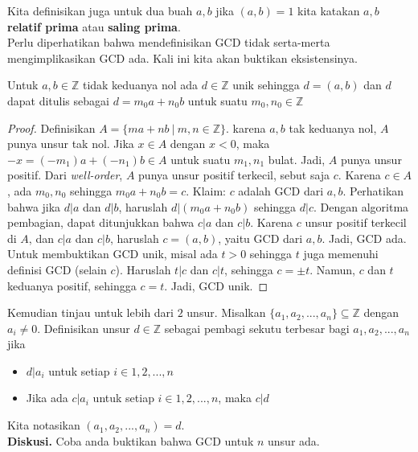 	Kita definisikan juga untuk dua buah $a,b$ jika $(a,b) = 1$ kita katakan $a,b$ \textbf{relatif prima} atau \textbf{saling prima}.
	\\
	
	Perlu diperhatikan bahwa mendefinisikan GCD tidak serta-merta mengimplikasikan GCD ada. Kali ini kita akan buktikan eksistensinya.
	
	\begin{theorem}
		Untuk $a,b \in \mathbb{Z}$ tidak keduanya nol ada $d \in \mathbb{Z}$ unik sehingga $d = (a,b)$ dan $d$ dapat ditulis sebagai $d = m_0a + n_0b$ untuk suatu $m_0,n_0 \in \mathbb{Z}$
	\end{theorem}
	
	\begin{proof}
		 Definisikan $A = \{ma + nb \ | \ m,n \in \mathbb{Z}\}$. karena $a,b$ tak keduanya nol, $A$ punya unsur tak nol. Jika $x \in A$ dengan $x < 0$, maka $-x = (-m_1)a + (-n_1)b \in A$ untuk suatu $m_1, n_1$ bulat. Jadi, $A$ punya unsur positif. Dari \textit{well-order}, $A$ punya unsur positif terkecil, sebut saja $c$. Karena $c \in A$, ada $m_0, n_0$ sehingga $m_0a + n_0b = c$. Klaim: $c$ adalah GCD dari $a,b$. Perhatikan bahwa jika $d | a$ dan $d |b$, haruslah $d | (m_0 a + n_0b)$ sehingga $d|c$. Dengan algoritma pembagian, dapat ditunjukkan bahwa $c | a$ dan $c | b$. Karena $c$ unsur positif terkecil di $A$, dan $c | a$ dan $c | b$, haruslah $c = (a,b)$, yaitu GCD dari $a,b$. Jadi, GCD ada.
		 \\
		 
		 Untuk membuktikan GCD unik, misal ada $t > 0$ sehingga $t$ juga memenuhi definisi GCD (selain $c$). Haruslah $t | c$ dan $c | t$, sehingga $c = \pm t$. Namun, $c$ dan $t$ keduanya positif, sehingga $c = t$. Jadi, GCD unik.
	\end{proof}
	
	Kemudian tinjau untuk lebih dari $2$ unsur. Misalkan $\{ a_1, a_2, ..., a_n \} \subseteq \mathbb{Z}$ dengan $a_i \ne 0$. Definisikan unsur $d \in \mathbb{Z}$ sebagai pembagi sekutu terbesar bagi $a_1, a_2, ..., a_n$ jika
	\begin{itemize}
		\item $d | a_i$ untuk setiap $i \in {1,2,...,n}$
		\item Jika ada $c | a_i$ untuk setiap $i \in {1,2,...,n}$, maka $c | d$
	\end{itemize}
	Kita notasikan $(a_1, a_2, ..., a_n) = d$.
	\\
	
	\textbf{Diskusi. }Coba anda buktikan bahwa GCD untuk $n$ unsur ada.
